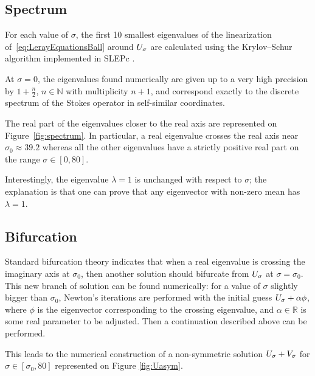 \documentclass[12pt,reqno]{amsart}
\theoremstyle{plain}
\theoremstyle{definition}
\newcommand{\R}{\mathbb{R}}
\newcommand{\N}{\mathbb{N}}
\renewcommand{\:}{\colon}
\let\tilde\relax
\newcommand{\tilde}[1]{\widetilde{#1}}
\numberwithin{equation}{section}
\numberwithin{figure}{section}
\begin{document}
\subsection{Spectrum}

For each value of $\sigma$, the first 10 smallest eigenvalues of
the linearization of~\eqref{eq:LerayEquationsBall} around $\tilde{U}_{\sigma}$ are calculated
using the Krylov--Schur algorithm \cite{Hernandez-KrylovSchur2009} implemented
in SLEPc \cite{Hernandez-SLEPc2005}.

At $\sigma=0$, the eigenvalues found numerically are given up to
a very high precision by $1+\frac{n}{2}$, $n\in\N$ with
multiplicity $n+1$, and correspond exactly to the discrete spectrum
of the Stokes operator in self-similar coordinates.

The real part of the eigenvalues closer to the real axis are represented
on Figure~\ref{fig:spectrum}. In particular, a real eigenvalue crosses the
real axis near $\sigma_{0}\approx39.2$ whereas all the other eigenvalues
have a strictly positive real part on the range $\sigma\in[0,80]$.

Interestingly, the eigenvalue $\lambda=1$ is unchanged with respect
to $\sigma$; the explanation is that one can prove that any eigenvector
with non-zero mean has $\lambda=1$.

\subsection{Bifurcation}

Standard bifurcation theory indicates that when a real eigenvalue
is crossing the imaginary axis at $\sigma_{0}$, then another solution
should bifurcate from $\tilde{U}_{\sigma}$ at $\sigma=\sigma_{0}$.
This new branch of solution can be found numerically: for a value
of $\sigma$ slightly bigger than $\sigma_{0}$, Newton's iterations
are performed with the initial guess $\tilde{U}_{\sigma}+\alpha\phi$,
where $\phi$ is the eigenvector corresponding to the crossing eigenvalue,
and $\alpha\in\R$ is some real parameter to be adjusted.
Then a continuation described above can be performed.

This leads to the numerical construction of a non-symmetric solution
$\tilde{U}_{\sigma}+\tilde{V}_{\sigma}$ for $\sigma\in[\sigma_{0},80]$
represented on Figure \ref{fig:Uasym}.
\end{document}
